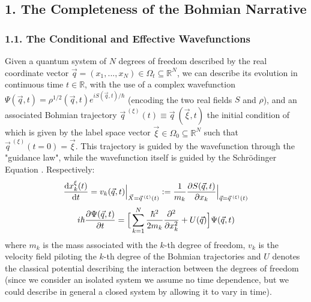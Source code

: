 \documentclass[11pt, a4paper]{article} %
\newcommand{\R}{\mathbb{R}} %
\begin{document}

\subsection*{1. The Completeness of the Bohmian Narrative}
\vspace{-0.2cm}

\subsubsection*{1.1. The Conditional and Effective Wavefunctions}
\vspace{-0.2cm}

Given a quantum system of $N$ degrees of freedom described by the real coordinate vector $\vec{q}=(x_1,...,x_N)\in\Omega_t\subseteq\R^N$, we can describe its evolution in continuous time $t\in\R$, with the use of a complex wavefunction $\Psi(\vec{q},t)=\rho^{1/2}(\vec{q},t)e^{iS(\vec{q},t)/\hbar}$ (encoding the two real fields $S$ and $\rho$), and an associated Bohmian trajectory $\vec{q}^{\:(\xi)}(t)\equiv \vec{q}\:(\vec{\xi},t)$ the initial condition of which is given by the label space vector $\vec{\xi}\in\Omega_0\subseteq\R^N$ such that $\vec{q}^{\:(\xi)}(t=0)=\vec{\xi}$. This trajectory is guided by the wavefunction through the "guidance law", while the wavefunction itself is guided by the Schrödinger Equation \cite{Bohm,Holland,Durr,JordiXavier}. Respectively:\vspace{-0.15cm}
\begin{equation}\label{GL}
\dv{x_k^\xi(t)}{t} = v_k(\vec{q},t)\Big\rvert_{\vec{X}=\vec{q}^{\:(\xi)}(t)}:=\frac{1}{m_k} \pdv{S(\vec{q},t)}{x_k}\Big\rvert_{\vec{q}=\vec{q}^{\:(\xi)}(t)}
\end{equation}
\begin{equation}\label{SE}
i\hbar\pdv{\Psi(\vec{q},t)}{t}=\Big[ \sum_{k=1}^N \frac{\hbar^2}{2m_k}\pdv[2]{}{x_k}+U(\vec{q})\Big]\Psi(\vec{q},t)
\end{equation}
where $m_k$ is the mass associated with the $k$-th degree of freedom, $v_k$ is the velocity field piloting the $k$-th degree of the Bohmian trajectories and $U$ denotes the classical potential describing the interaction between the degrees of freedom (since we consider an isolated system we assume no time dependence, but we could describe in general a closed system by allowing it to vary in time).
\end{document}
